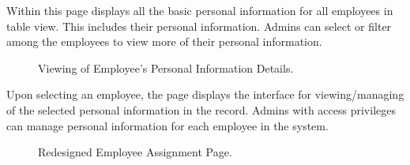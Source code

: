     Within this page displays all the basic personal information for all employees in table view. This includes their personal information. Admins can select or filter among the employees to view more of their personal information.

    \begin{figure}[H]
        \centering
        \caption{Viewing of Employee's Personal Information Details.}
        \label{fig:app-pi-info}
    \end{figure}

    Upon selecting an employee, the page displays the interface for viewing/managing of the selected personal information in the record. Admins with access privileges can manage personal information for each employee  in the system.

    \begin{figure}[H]
        \centering
        \caption{Redesigned Employee Assignment Page.}
        \label{fig:app-assignment}
    \end{figure}

